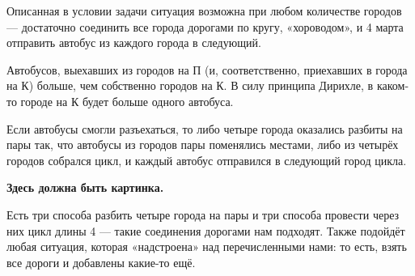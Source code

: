 \begin{itemize}

\itA Описанная в условии задачи ситуация возможна при любом количестве городов — достаточно соединить все города дорогами по кругу, «хороводом», и 4 марта отправить автобус из каждого города в следующий.

\itB Автобусов, выехавших из городов на П (и, соответственно, приехавших в города на К) больше, чем собственно городов на К. В силу принципа Дирихле, в каком-то городе на К будет больше одного автобуса.

\itC Если автобусы смогли разъехаться, то либо четыре города оказались разбиты на пары так, что автобусы из городов пары поменялись местами, либо из четырёх городов собрался цикл, и каждый автобус отправился в следующий город цикла.

{\bfseries Здесь должна быть картинка.}

Есть три способа разбить четыре города на пары и три способа провести через них цикл длины 4 — такие соединения дорогами нам подходят. Также подойдёт любая ситуация, которая «надстроена» над перечисленными нами: то есть, взять все дороги и добавлены какие-то ещё.
\end{itemize}